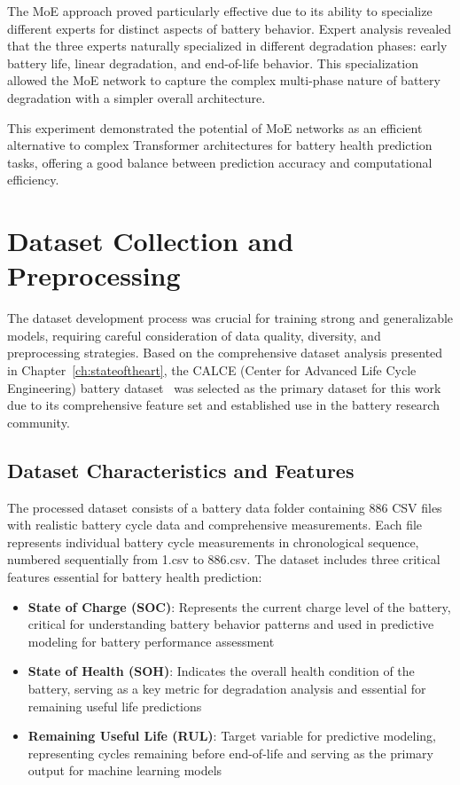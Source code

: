 The MoE approach proved particularly effective due to its ability to specialize different experts for distinct aspects of battery behavior. Expert analysis revealed that the three experts naturally specialized in different degradation phases: early battery life, linear degradation, and end-of-life behavior. This specialization allowed the MoE network to capture the complex multi-phase nature of battery degradation with a simpler overall architecture.

This experiment demonstrated the potential of MoE networks as an efficient alternative to complex Transformer architectures for battery health prediction tasks, offering a good balance between prediction accuracy and computational efficiency.

\section{Dataset Collection and Preprocessing}
\label{sec:dataset_preprocessing}

The dataset development process was crucial for training strong and generalizable models, requiring careful consideration of data quality, diversity, and preprocessing strategies. Based on the comprehensive dataset analysis presented in Chapter~\ref{ch:stateoftheart}, the CALCE (Center for Advanced Life Cycle Engineering) battery dataset~\cite{CALCE_battery_nodate} was selected as the primary dataset for this work due to its comprehensive feature set and established use in the battery research community.

\subsection{Dataset Characteristics and Features}
\label{subsec:dataset_characteristics}

The processed dataset consists of a battery data folder containing 886 CSV files with realistic battery cycle data and comprehensive measurements. Each file represents individual battery cycle measurements in chronological sequence, numbered sequentially from 1.csv to 886.csv. The dataset includes three critical features essential for battery health prediction:

\begin{itemize}
    \item \textbf{State of Charge (SOC)}: Represents the current charge level of the battery, critical for understanding battery behavior patterns and used in predictive modeling for battery performance assessment
    \item \textbf{State of Health (SOH)}: Indicates the overall health condition of the battery, serving as a key metric for degradation analysis and essential for remaining useful life predictions
    \item \textbf{Remaining Useful Life (RUL)}: Target variable for predictive modeling, representing cycles remaining before end-of-life and serving as the primary output for machine learning models
\end{itemize}

